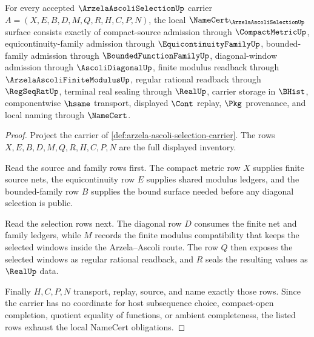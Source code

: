 \begin{theorem}
\label{thm:arzela-ascoli-selection-namecert-obligations}
For every accepted $\ArzelaAscoliSelectionUp$ carrier $A=(X,E,B,D,M,Q,R,H,C,P,N)$, the local $\NameCert_{\ArzelaAscoliSelectionUp}$ surface consists exactly of compact-source admission through $\CompactMetricUp$, equicontinuity-family admission through $\EquicontinuityFamilyUp$, bounded-family admission through $\BoundedFunctionFamilyUp$, diagonal-window admission through $\AscoliDiagonalUp$, finite modulus readback through $\ArzelaAscoliFiniteModulusUp$, regular rational readback through $\RegSeqRatUp$, terminal real sealing through $\RealUp$, carrier storage in $\BHist$, componentwise $\hsame$ transport, displayed $\Cont$ replay, $\Pkg$ provenance, and local naming through $\NameCert$.
\end{theorem}
\begin{proof}
Project the carrier of \autoref{def:arzela-ascoli-selection-carrier}. The rows $X,E,B,D,M,Q,R,H,C,P,N$ are the full displayed inventory.

Read the source and family rows first. The compact metric row $X$ supplies finite source nets, the equicontinuity row $E$ supplies shared modulus ledgers, and the bounded-family row $B$ supplies the bound surface needed before any diagonal selection is public.

Read the selection rows next. The diagonal row $D$ consumes the finite net and family ledgers, while $M$ records the finite modulus compatibility that keeps the selected windows inside the Arzela--Ascoli route. The row $Q$ then exposes the selected windows as regular rational readback, and $R$ seals the resulting values as $\RealUp$ data.

Finally $H,C,P,N$ transport, replay, source, and name exactly those rows. Since the carrier has no coordinate for host subsequence choice, compact-open completion, quotient equality of functions, or ambient completeness, the listed rows exhaust the local NameCert obligations.
\end{proof}

